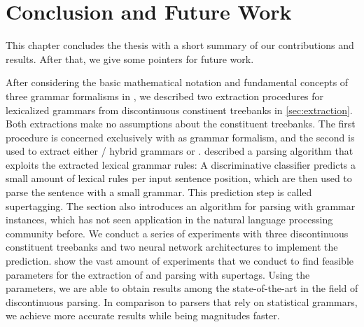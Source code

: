 \documentclass[../document.tex]{subfiles}
\begin{document}
    \chapter{Conclusion and Future Work}
    This chapter concludes the thesis with a short summary of our contributions and results.
    After that, we give some pointers for future work.

    After considering the basic mathematical notation and fundamental concepts of three grammar formalisms in , we described two extraction procedures for lexicalized grammars from discontinuous constiuent treebanks in \cref{sec:extraction}.
    Both extractions make no assumptions about the constituent treebanks.
    The first procedure is concerned exclusively with  as grammar formalism, and the second is used to extract either / hybrid grammars or .
     described a parsing algorithm that exploits the extracted lexical grammar rules:
        A discriminative classifier predicts a small amount of lexical rules per input sentence position, which are then used to parse the sentence with a small grammar.
    This prediction step is called supertagging.
    The section also introduces an algorithm for parsing with  grammar instances, which has not seen application in the natural language processing community before.
    We conduct a series of experiments with three discontinuous constituent treebanks and two neural network architectures to implement the prediction.
     show the vast amount of experiments that we conduct to find feasible parameters for the extraction of and parsing with supertags.
    Using the parameters, we are able to obtain results among the state-of-the-art in the field of discontinuous parsing.
    In comparison to parsers that rely on statistical grammars, we achieve more accurate results while being magnitudes faster.
    
\end{document}
